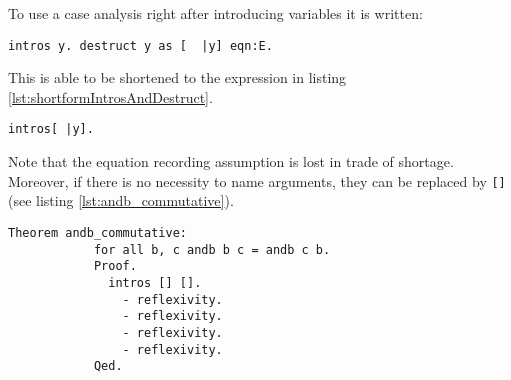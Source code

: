 		  To use a case analysis right after introducing variables it is written:
		  \begin{lstlisting}[caption = \lstinline!intros! and \lstinline!destruct!]
		  	intros y. destruct y as [  |y] eqn:E.
		  \end{lstlisting}	
		  This is able to be shortened to the expression in listing \ref{lst:shortformIntrosAndDestruct}.  
		  \begin{lstlisting}[caption= shortform \lstinline!intros! and  \lstinline!destruct!, label= lst:shortformIntrosAndDestruct]
		  intros[ |y].
		  \end{lstlisting}		  
		  Note that the equation recording assumption is lost in trade of shortage.
		  Moreover, if there is no necessity to name arguments, they can be replaced by \lstinline![]! (see listing \ref{lst:andb_commutative}).
		  \begin{lstlisting}[caption= \lstinline!andb_commutative!, label =lst:andb_commutative]
		  Theorem andb_commutative:
		    for all b, c andb b c = andb c b.
		    Proof.
		      intros [] [].
		        - reflexivity.
		        - reflexivity.
		        - reflexivity.
		        - reflexivity.
		    Qed. 		  		  
		  \end{lstlisting}
		     
	    
   
   
   
